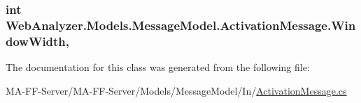 \subsubsection[{Window\+Width}]{\setlength{\rightskip}{0pt plus 5cm}int Web\+Analyzer.\+Models.\+Message\+Model.\+Activation\+Message.\+Window\+Width\hspace{0.3cm}{\ttfamily [get]}, {\ttfamily [set]}}\label{class_web_analyzer_1_1_models_1_1_message_model_1_1_activation_message_adb9b326b9f17dd3dbe0ef8a645b7b38b}


The documentation for this class was generated from the following file\+:\begin{DoxyCompactItemize}
\item 
M\+A-\/\+F\+F-\/\+Server/\+M\+A-\/\+F\+F-\/\+Server/\+Models/\+Message\+Model/\+In/\hyperlink{_activation_message_8cs}{Activation\+Message.\+cs}\end{DoxyCompactItemize}
